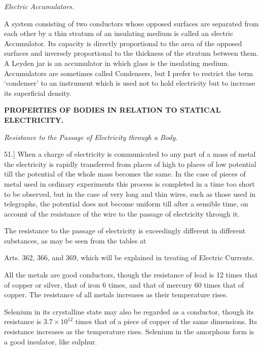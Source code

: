 \documentclass[11pt,a4paper]{article}
\begin{document}
\begin{center}
\textit{Electric Accumulators.}
\end{center}

A system consisting of two conductors whose opposed surfaces are
separated from each other by a thin stratum of an insulating medium is
called an electric Accumulator. Its capacity is directly proportional to
the area of the opposed surfaces and inversely proportional to the
thickness of the stratum between them. A Leyden jar is an accumulator in
which glass is the insulating medium. Accumulators are sometimes called
Condensers, but I prefer to restrict the term `condenser' to an
instrument which is used not to hold electricity but to increase its
superficial density.

\begin{center}
\textbf{PROPERTIES OF BODIES IN RELATION TO STATICAL ELECTRICITY.}
\end{center}

\begin{center}
\textit{Resistance to the Passage of Electricity through a Body.}
\end{center}

51.] When a charge of electricity is communicated to any part of a mass
of metal the electricity is rapidly transferred from places of high to
places of low potential till the potential of the whole mass becomes the
same. In the case of pieces of metal used in ordinary experiments this
process is completed in a time too short to be observed, but in the case
of very long and thin wires, such as those used in telegraphs, the
potential does not become uniform till after a sensible time, on account
of the resistance of the wire to the passage of electricity through it.

The resistance to the passage of electricity is exceedingly different in
different substances, as may be seen from the tables at

\clearpage
\setcounter{footnote}{0}

Arts. 362, 366, and 369, which will be explained in treating of
Electric Currents.

All the metals are good conductors, though the resistance of lead is 12
times that of copper or silver, that of iron 6 times, and that of
mercury 60 times that of copper. The resistance of all metals increases
as their temperature rises.

Selenium in its crystalline state may also be regarded as a conductor,
though its resistance is \(3.7 \times 10^{12}\) times that of a piece of
copper of the same dimensions. Its resistance increases as the
temperature rises. Selenium in the amorphous form is a good insulator,
like sulphur.
\end{document}
